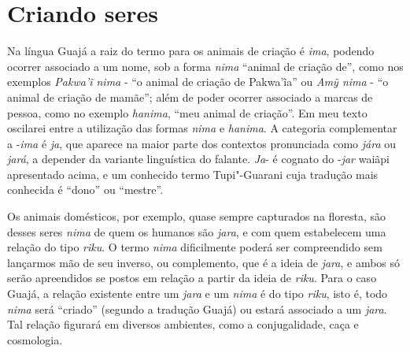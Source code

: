 \section{Criando seres}\label{criando-seres}

Na língua Guajá a raiz do termo para os animais de criação é \emph{ima},
podendo ocorrer associado a um nome, sob a forma \emph{nima} ``animal de
criação de'', como nos exemplos \emph{Pakwa'ĩ nima} - ``o animal de
criação de Pakwa'ĩa'' ou \emph{Amỹ nima} - ``o animal de criação de
mamãe''; além de poder ocorrer associado a marcas de pessoa, como no
exemplo \emph{hanima}, ``meu animal de criação''. Em meu texto oscilarei
entre a utilização das formas \emph{nima} e \emph{hanima}. A categoria
complementar a -\emph{ima} é \emph{ja}, que aparece na maior parte dos
contextos pronunciada como \emph{jára} ou \emph{jará}, a depender da
variante linguística do falante. \emph{Ja}- é cognato do -\emph{jar}
waiãpi apresentado acima, e um conhecido termo Tupi"-Guarani cuja
tradução mais conhecida é ``dono'' ou ``mestre''.

Os animais domésticos, por exemplo, quase sempre capturados na floresta,
são desses seres \emph{nima} de quem os humanos são \emph{jara}, e com
quem estabelecem uma relação do tipo \emph{riku}. O termo \emph{nima}
dificilmente poderá ser compreendido sem lançarmos mão de seu inverso,
ou complemento, que é a ideia de \emph{jara}, e ambos só serão
apreendidos se postos em relação a partir da ideia de \emph{riku}. Para
o caso Guajá, a relação existente entre um \emph{jara} e um \emph{nima}
é do tipo \emph{riku}, isto é, todo \emph{nima} será ``criado'' (segundo a
tradução Guajá) ou estará associado a um \emph{jara}. Tal relação
figurará em diversos ambientes, como a conjugalidade, caça e cosmologia.

